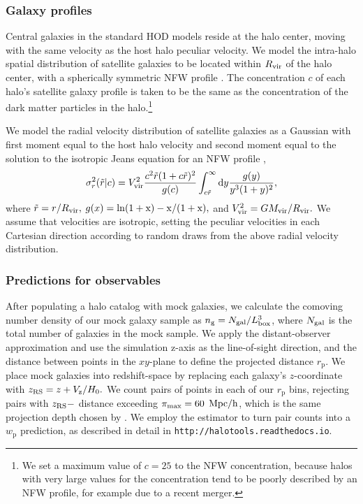 \documentclass[usenatbib,usegraphicx,letterpaper]{mn2e}
\newcommand{\mvir}{M_{\rm vir}}
\newcommand{\rvir}{R_{\rm vir}}
\newcommand{\wprp}{w_{\mathrm{p}}}
\newcommand{\rp}{r_{\mathrm{p}}}
\begin{document}
\subsubsection{Galaxy profiles}

Central galaxies in the standard HOD models reside at the halo center,
moving with the same velocity as the host halo peculiar velocity. We
model the intra-halo spatial distribution of satellite galaxies to be
located within $\rvir$ of the halo center, with a spherically
symmetric NFW profile \citep{nfw97}.  The concentration $c$ of each
halo's satellite galaxy profile is taken to be the same as the
concentration of the dark matter particles in the halo.\footnote{We
  set a maximum value of $c=25$ to the NFW concentration, because
  halos with very large values for the concentration tend to be poorly
  described by an NFW profile, for example due to a recent merger.}


We model the radial velocity distribution of satellite galaxies as a
Gaussian with first moment equal to the host halo velocity and second
moment equal to the solution to the isotropic Jeans equation for an
NFW profile \citep{more09b},
\begin{equation}
\sigma^{2}_{r}(\tilde{r}|c) = V_{\rm vir}^{2}\frac{c^{2}\tilde{r}(1 + c\tilde{r})^{2}}{g(c)}\int_{c\tilde{r}}^{\infty}{\rm d}y\frac{g(y)}{y^{3}(1 + y)^{2}},
\end{equation}
where $\tilde{r} = r/\rvir,$ $g(x) = \rm{ln}(1+x) - x / (1+x),$ and
$V_{\rm vir}^{2} = G\mvir/\rvir.$ We assume that velocities are
isotropic, setting the peculiar velocities in each Cartesian direction
according to random draws from the above radial velocity distribution.


\subsubsection{Predictions for observables}

After populating a halo catalog with mock galaxies, we calculate the
comoving number density of our mock galaxy sample as $n_{\rm g} =
N_{\rm gal} / L_{\rm box}^3$, where $N_{\rm gal}$ is the total number of
galaxies in the mock sample. We apply the distant-observer
approximation and use the simulation z-axis as the line-of-sight
direction, and the distance between points in the $xy$-plane to define
the projected distance $\rp.$ We place mock galaxies into
redshift-space by replacing each galaxy's $z$-coordinate with
$z_{\rm RS} = z + V_{\rm z}/H_0.$ We count pairs of points in each of
our $\rp$ bins, rejecting pairs with $z_{\rm RS}-$ distance exceeding
$\pi_{\rm max}=60$ ${\rm Mpc/h}$, which is the same projection
depth chosen by \citet{zehavi_etal11}. We employ the \citet{landyszalay93}
estimator to turn pair counts into a $\wprp$ prediction, as described
in detail in {\tt http://halotools.readthedocs.io}.
\end{document}
